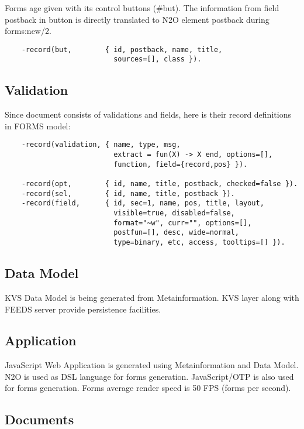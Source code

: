 Forms age given with its control buttons (\#but).
The information from field postback in button is directly translated
to N2O element postback during forms:new/2.

\vspace{1\baselineskip}
\begin{lstlisting}
    -record(but,        { id, postback, name, title,
                          sources=[], class }).
\end{lstlisting}

\subsection{Validation}
Since document consists of validations and fields, here is their
record definitions in FORMS model:

\vspace{1\baselineskip}
\begin{lstlisting}
    -record(validation, { name, type, msg,
                          extract = fun(X) -> X end, options=[],
                          function, field={record,pos} }).

    -record(opt,        { id, name, title, postback, checked=false }).
    -record(sel,        { id, name, title, postback }).
    -record(field,      { id, sec=1, name, pos, title, layout,
                          visible=true, disabled=false,
                          format="~w", curr="", options=[],
                          postfun=[], desc, wide=normal,
                          type=binary, etc, access, tooltips=[] }).
\end{lstlisting}

\subsection{Data Model}
KVS Data Model is being generated from Metainformation.
KVS layer along with FEEDS server provide persistence facilities.

\subsection{Application}
JavaScript Web Application is generated using Metainformation and Data Model.
N2O is used as DSL language for forms generation.
JavaScript/OTP is also used for forms generation.
Forms average render speed is 50 FPS (forms per second).

\subsection{Documents}

